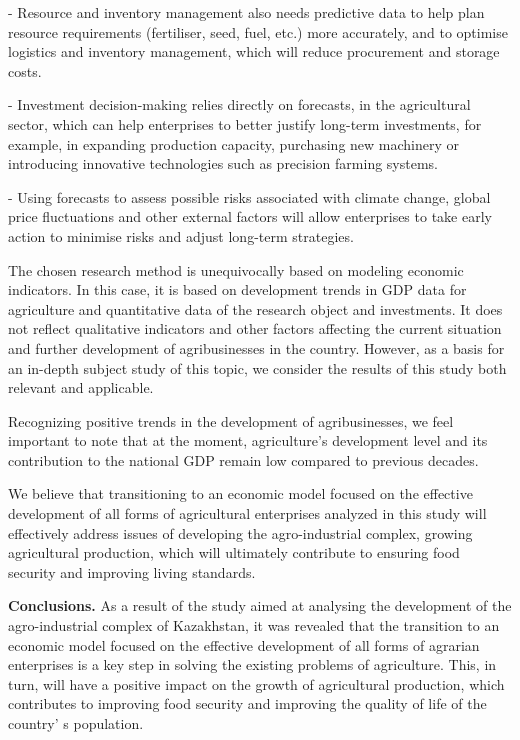 \begin{multicols}{2}
- Resource and inventory management also needs predictive data to help
plan resource requirements (fertiliser, seed, fuel, etc.) more
accurately, and to optimise logistics and inventory management, which
will reduce procurement and storage costs.

- Investment decision-making relies directly on forecasts, in the
agricultural sector, which can help enterprises to better justify
long-term investments, for example, in expanding production capacity,
purchasing new machinery or introducing innovative technologies such as
precision farming systems.

- Using forecasts to assess possible risks associated with climate
change, global price fluctuations and other external factors will allow
enterprises to take early action to minimise risks and adjust long-term
strategies.

The chosen research method is unequivocally based on modeling economic
indicators. In this case, it is based on development trends in GDP data
for agriculture and quantitative data of the research object and
investments. It does not reflect qualitative indicators and other
factors affecting the current situation and further development of
agribusinesses in the country. However, as a basis for an in-depth
subject study of this topic, we consider the results of this study both
relevant and applicable.

Recognizing positive trends in the development of agribusinesses, we
feel important to note that at the moment, agriculture's development
level and its contribution to the national GDP remain low compared to
previous decades.

We believe that transitioning to an economic model focused on the
effective development of all forms of agricultural enterprises analyzed
in this study will effectively address issues of developing the
agro-industrial complex, growing agricultural production, which will
ultimately contribute to ensuring food security and improving living
standards.

{\bfseries Conclusions.} As a result of the study aimed at analysing the
development of the agro-industrial complex of Kazakhstan, it was
revealed that the transition to an economic model focused on the
effective development of all forms of agrarian enterprises is a key step
in solving the existing problems of agriculture. This, in turn, will
have a positive impact on the growth of agricultural production, which
contributes to improving food security and improving the quality of life
of the country' s population.


\end{multicols}
